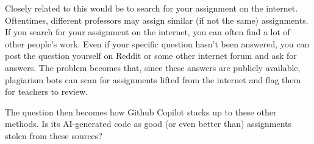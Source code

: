 \documentclass{article}
\begin{document}
Closely related to this would be to search for your assignment on the internet. Oftentimes, different professors may assign similar (if not the same) assignments. If you search for your assignment on the internet, you can often find a lot of other people's work. Even if your specific question hasn't been answered, you can post the question yourself on Reddit or some other internet forum and ask for answers. The problem becomes that, since these answers are publicly available, plagiarism bots can scan for assignments lifted from the internet and flag them for teachers to review.

The question then becomes how Github Copilot stacks up to these other methods. Is its AI-generated code as good (or even better than) assignments stolen from these sources? 
\end{document}
